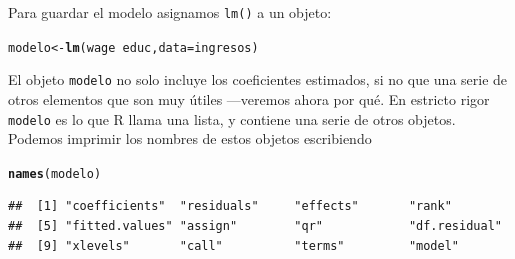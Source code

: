 \documentclass{article}\usepackage[]{graphicx}\usepackage[]{color}
\makeatletter
\newcommand{\hlopt}[1]{\textcolor[rgb]{0,0,0}{#1}}%
\newcommand{\hlstd}[1]{\textcolor[rgb]{0.345,0.345,0.345}{#1}}%
\newcommand{\hlkwb}[1]{\textcolor[rgb]{0.69,0.353,0.396}{#1}}%
\newcommand{\hlkwc}[1]{\textcolor[rgb]{0.333,0.667,0.333}{#1}}%
\newcommand{\hlkwd}[1]{\textcolor[rgb]{0.737,0.353,0.396}{\textbf{#1}}}%
\newenvironment{kframe}{%
 \def\at@end@of@kframe{}%
 \ifinner\ifhmode%
  \def\at@end@of@kframe{\end{minipage}}%
  \begin{minipage}{\columnwidth}%
 \fi\fi%
 \def\FrameCommand##1{\hskip\@totalleftmargin \hskip-\fboxsep
 \colorbox{shadecolor}{##1}\hskip-\fboxsep
     \hskip-\linewidth \hskip-\@totalleftmargin \hskip\columnwidth}%
 \MakeFramed {\advance\hsize-\width
   \@totalleftmargin\z@ \linewidth\hsize
   \@setminipage}}%
 {\par\unskip\endMakeFramed%
 \at@end@of@kframe}
\newenvironment{knitrout}{}{} %
\makeatother
\begin{document}
Para guardar el modelo asignamos \verb|lm()| a un objeto:

\begin{knitrout}
\color{fgcolor}\begin{kframe}
\begin{alltt}
\hlstd{modelo} \hlkwb{<-} \hlkwd{lm}\hlstd{(wage} \hlopt{~} \hlstd{educ,} \hlkwc{data} \hlstd{= ingresos)}
\end{alltt}
\end{kframe}
\end{knitrout}

El objeto \verb|modelo| no solo incluye los coeficientes estimados, si no que una serie de otros elementos que son muy útiles ---veremos ahora por qué. En estricto rigor \verb|modelo| es lo que R llama una lista, y contiene una serie de otros objetos. Podemos imprimir los nombres de estos objetos escribiendo
\begin{knitrout}
\color{fgcolor}\begin{kframe}
\begin{alltt}
\hlkwd{names}\hlstd{(modelo)}
\end{alltt}
\begin{verbatim}
##  [1] "coefficients"  "residuals"     "effects"       "rank"         
##  [5] "fitted.values" "assign"        "qr"            "df.residual"  
##  [9] "xlevels"       "call"          "terms"         "model"
\end{verbatim}
\end{kframe}
\end{knitrout}
\end{document}
